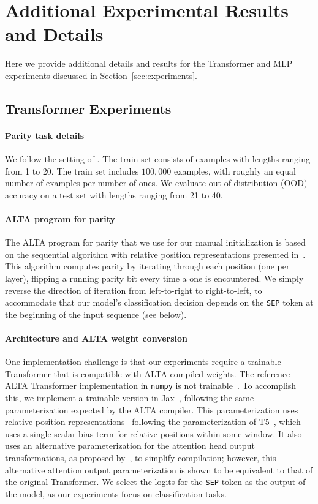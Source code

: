 
\section{Additional Experimental Results and Details}
\label{sec:appendix-experiments}

Here we provide additional details and results for the Transformer and MLP experiments discussed in Section~\ref{sec:experiments}.

\subsection{Transformer Experiments}
\label{sec:transformer-exp-details}

\paragraph{Parity task details} We follow the setting of \citet{shaw2024alta}. The train set consists of examples with lengths ranging from 1 to 20. The train set includes $100,000$ examples, with roughly an equal number of examples per number of ones. We evaluate out-of-distribution (OOD) accuracy on a test set with lengths ranging from 21 to 40. 

\paragraph{ALTA program for parity} The ALTA program for parity that we use for our manual initialization is based on the sequential algorithm with relative position representations presented in~\citet{shaw2024alta}. This algorithm computes parity by iterating through each position (one per layer), flipping a running parity
bit every time a one is encountered. We simply reverse the direction of iteration from left-to-right to right-to-left, to accommodate that our model's classification decision depends on the \texttt{SEP} token at the beginning of the input sequence (see below).

\paragraph{Architecture and ALTA weight conversion}
One implementation challenge is that our experiments require a trainable Transformer that is compatible with ALTA-compiled weights. The reference ALTA Transformer implementation in \texttt{numpy} is not trainable~\citep{shaw2024alta}. To accomplish this, we implement a trainable version in Jax~\citep{jax2018github}, following the same parameterization expected by the ALTA compiler. This parameterization uses relative position representations~\citep{shaw2018self} following the parameterization of T5~\citep{raffel2020exploring}, which uses a single scalar bias term for relative positions within some window. It also uses an alternative parameterization for the attention head output transformations, as proposed by~\citet{elhage2021mathematical}, to simplify compilation; however, this alternative attention output parameterization is shown to be equivalent to that of the original Transformer. We select the logits for the \texttt{SEP} token as the output of the model, as our experiments focus on classification tasks.

